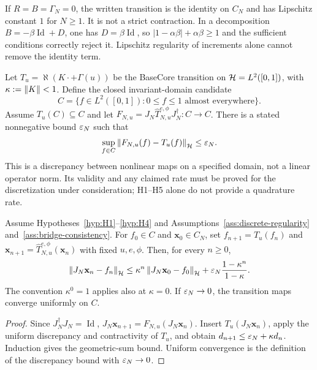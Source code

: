 \begin{example}\label{ex:discrete-identity-control}
If $R=B=\Gamma_N=0$, the written transition is the identity on $C_N$ and has Lipschitz constant $1$ for $N\geq1$. It is not a strict contraction. In a decomposition $B=-\beta\operatorname{Id}+D$, one has $D=\beta\operatorname{Id}$, so $|1-\alpha\beta|+\alpha\beta\geq1$ and the sufficient conditions correctly reject it. Lipschitz regularity of increments alone cannot remove the identity term.
\end{example}

\begin{assumption}\label{ass:bridge-consistency}
Let $T_u=\aleph(K\cdot+\Gamma(u))$ be the BaseCore transition on $\mathcal{H}=L^2([0,1])$, with $\kappa:=\left\lVert K \right\rVert<1$. Define the closed invariant-domain candidate
\[
C=\{f\in L^2([0,1]):0\leq f\leq1\text{ almost everywhere}\}.
\]
Assume $T_u(C)\subseteq C$ and let $F_{N,u}=J_N\widehat T_{N,u}^{e,\phi}J_N^\dagger:C\to C$. There is a stated nonnegative bound $\varepsilon_N$ such that
\[
\sup_{f\in C}\left\lVert F_{N,u}(f)-T_u(f) \right\rVert_{\mathcal{H}}\leq\varepsilon_N.
\]
This is a discrepancy between nonlinear maps on a specified domain, not a linear operator norm. Its validity and any claimed rate must be proved for the discretization under consideration; H1--H5 alone do not provide a quadrature rate.
\end{assumption}

\begin{theorem}\label{thm:bridge}
Assume Hypotheses~\ref{hyp:H1}--\ref{hyp:H4} and Assumptions~\ref{ass:discrete-regularity} and~\ref{ass:bridge-consistency}. For $f_0\in C$ and $\mathbf{x}_0\in C_N$, set $f_{n+1}=T_u(f_n)$ and $\mathbf{x}_{n+1}=\widehat T_{N,u}^{e,\phi}(\mathbf{x}_n)$ with fixed $u,e,\phi$. Then, for every $n\geq0$,
\[
\left\lVert J_N\mathbf{x}_n-f_n \right\rVert_{\mathcal{H}}
\leq\kappa^n\left\lVert J_N\mathbf{x}_0-f_0 \right\rVert_{\mathcal{H}}
+\varepsilon_N\frac{1-\kappa^n}{1-\kappa}.
\]
The convention $\kappa^0=1$ applies also at $\kappa=0$. If $\varepsilon_N\to0$, the transition maps converge uniformly on $C$.
\end{theorem}

\begin{proof}
Since $J_N^\dagger J_N=\operatorname{Id}$, $J_N\mathbf{x}_{n+1}=F_{N,u}(J_N\mathbf{x}_n)$. Insert $T_u(J_N\mathbf{x}_n)$, apply the uniform discrepancy and contractivity of $T_u$, and obtain $d_{n+1}\leq\varepsilon_N+\kappa d_n$. Induction gives the geometric-sum bound. Uniform convergence is the definition of the discrepancy bound with $\varepsilon_N\to0$.
\end{proof}

